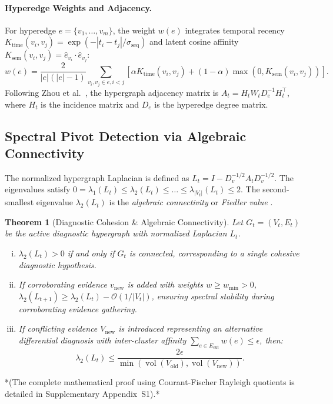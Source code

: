 \documentclass[12pt]{article}
\newtheorem{theorem}{Theorem}
\DeclareMathOperator{\vol}{vol}
\begin{document}
\paragraph{Hyperedge Weights and Adjacency.}
For hyperedge $e = \{v_1, \dots, v_m\}$, the weight $w(e)$ integrates temporal recency $K_{\text{time}}(v_i, v_j) = \exp(-|t_i - t_j|/\sigma_{\text{seq}})$ and latent cosine affinity $K_{\text{sem}}(v_i, v_j) = \hat{e}_{v_i} \cdot \hat{e}_{v_j}$:
\begin{equation}
  w(e) = \frac{2}{|e|(|e|-1)} \sum_{v_i, v_j \in e, i < j} \left[ \alpha K_{\text{time}}(v_i, v_j) + (1-\alpha) \max(0, K_{\text{sem}}(v_i, v_j)) \right].
  \label{eq:comp_weight}
\end{equation}
Following Zhou et al.\ \cite{zhou2006learning}, the hypergraph adjacency matrix is $A_t = H_t W_t D_e^{-1} H_t^\top$, where $H_t$ is the incidence matrix and $D_e$ is the hyperedge degree matrix.

\subsection*{Spectral Pivot Detection via Algebraic Connectivity}

The normalized hypergraph Laplacian is defined as $L_t = I - D_v^{-1/2} A_t D_v^{-1/2}$. The eigenvalues satisfy $0 = \lambda_1(L_t) \le \lambda_2(L_t) \le \dots \le \lambda_{|V_t|}(L_t) \le 2$. The second-smallest eigenvalue $\lambda_2(L_t)$ is the \emph{algebraic connectivity} or \emph{Fiedler value} \cite{fiedler1973algebraic}.

\begin{theorem}[Diagnostic Cohesion \& Algebraic Connectivity]
\label{thm:fiedler_cohesion}
Let $G_t = (V_t, E_t)$ be the active diagnostic hypergraph with normalized Laplacian $L_t$.
\begin{enumerate}[(i)]
  \item $\lambda_2(L_t) > 0$ if and only if $G_t$ is connected, corresponding to a single cohesive diagnostic hypothesis.
  \item If corroborating evidence $v_{\text{new}}$ is added with weights $w \ge w_{\min} > 0$, $\lambda_2(L_{t+1}) \ge \lambda_2(L_t) - \mathcal{O}(1/|V_t|)$, ensuring spectral stability during corroborating evidence gathering.
  \item If conflicting evidence $V_{\text{new}}$ is introduced representing an alternative differential diagnosis with inter-cluster affinity $\sum_{e \in E_{\text{cut}}} w(e) \le \epsilon$, then:
  \begin{equation}
    \lambda_2(L_t) \le \frac{2 \epsilon}{\min(\vol(V_{\text{old}}), \vol(V_{\text{new}}))}.
  \end{equation}
\end{enumerate}
\end{theorem}
\noindent
*(The complete mathematical proof using Courant-Fischer Rayleigh quotients is detailed in Supplementary Appendix~S1).*
\end{document}
